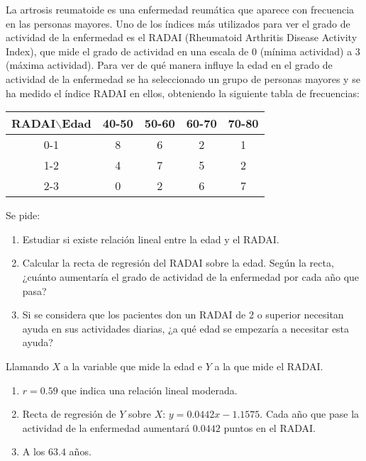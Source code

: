 {La artrosis reumatoide es una enfermedad reumática que aparece con frecuencia en las personas mayores. Uno de los índices más utilizados
para ver el grado de actividad de la enfermedad es el RADAI (Rheumatoid Arthritis Disease Activity Index), que mide el grado de actividad en
una escala de 0 (mínima actividad) a 3 (máxima actividad). Para ver de qué manera influye la edad en el grado de actividad de la enfermedad
se ha seleccionado un grupo de personas mayores y se ha medido el índice RADAI en ellos, obteniendo la siguiente tabla de frecuencias:
\begin{center}
\begin{tabular}{|c|c|c|c|c|}
\hline
 RADAI$\backslash$Edad & 40-50 & 50-60 & 60-70 & 70-80 \\
\hline
         0-1          &   8   &   6   &   2   &   1   \\
\hline
         1-2          &   4   &   7   &   5   &   2   \\
\hline
         2-3          &   0   &   2   &   6   &   7   \\
\hline
\end{tabular}
\end{center}
Se pide:
\begin{enumerate}
\item Estudiar si existe relación lineal entre la edad y el RADAI.
\item Calcular la recta de regresión del RADAI sobre la edad. Según la recta, ¿cuánto aumentaría el grado de actividad de la enfermedad por
cada año que pasa?
\item Si se considera que los pacientes don un RADAI de 2 o superior necesitan ayuda en sus actividades diarias, ¿a qué edad se empezaría a
necesitar esta ayuda?
\end{enumerate}
}
{Llamando $X$ a la variable que mide la edad e $Y$ a la que mide el RADAI.
\begin{enumerate}
\item $r=0.59$ que indica una relación lineal moderada.
\item Recta de regresión de $Y$ sobre $X$: $y=0.0442x-1.1575$. Cada año que pase la actividad de la enfermedad aumentará $0.0442$ puntos en
el RADAI.
\item A los $63.4$ años.
\end{enumerate}
}
